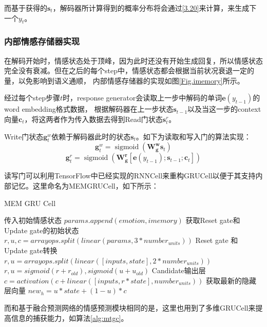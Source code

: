 \documentclass[supercite]{HustGraduPaper}
\theoremstyle{definition}
\begin{document}
而基于获得的$\boldsymbol{s}_t$，解码器所计算得到的概率分布将会通过\ref{3.20}来计算，来生成下一个$y_t$。

\subsubsection{内部情感存储器实现}
在解码开始时，情感状态处于顶峰，因为此时还没有开始生成回复，所以情感状态完全没有衰减。但在之后的每个step中，情感状态都会根据当前状况衰退一定的量，以免影响到语义通顺，
内部情感存储器的实现如图\ref{Fig.imemory}所示。

经过每个step步骤$t$时，response generator会读取上一步中解码的单词$\boldsymbol{e}(y_{t-1})$的word embedding格式数据，
根据解码器在上一步状态$\boldsymbol{s}_{t-1}$以及当这一步的context向量$\boldsymbol{c}_t$，将这两者作为传入数据去得到Read门状态${\boldsymbol{s}_t^r}$。

Write门状态$\boldsymbol{g}_t^w$依赖于解码器此时的状态$\boldsymbol{s}_t$。如下为读取和写入门的算法实现：
$$\boldsymbol { g } _ { t } ^ { w } = \operatorname { sigmoid } \left( \mathbf { W } _ { \mathbf { g } } ^ { \mathbf { w } } \boldsymbol { s } _ { t } \right)$$
$$\boldsymbol { g } _ { t } ^ { r } = \operatorname { sigmoid } \left( \mathbf { W } _ { \mathbf { g } } ^ { \mathbf { r } } \left[ \boldsymbol { e } \left( y _ { t - 1 } \right) ; \boldsymbol { s } _ { t - 1 } ; \boldsymbol { c } _ { t } \right] \right)$$

读写门可以利用TensorFlow中已经实现的RNNCell来重构GRUCell以便于其支持内部记忆。这里命名为MEMGRUCell，如下所示：
\begin{algorithm}
  \caption{MEM GRU Cell}
  \label{alg:mgc}
  \begin{algorithmic}
    \State 传入初始情感状态
    \State $params.append(emotion,imemory)$
    \State 获取Reset gate和Update gate的初始状态
    \State $r, u, c = arrayops.split(linear(params, 3 * number_{units}))$
    \State Reset gate 和 Update gate转换
    \State $r, u = arrayops.split(linear([inputs, state], 2 * number_{units}))$
    \State $r, u = sigmoid(r+r_{old}), sigmoid(u+u_{old})$
    \State Candidate输出层
    \State $c = activation(c+linear([inputs, r * state], number_{units}))$
    \State 获取最新的隐藏层向量
    \State $new_h = u * state + (1 - u) * c$
  \end{algorithmic}
\end{algorithm}

而和基于融合预测网络的情感预测模块相同的是，这里也用到了多维GRUCell来提高信息的捕获能力，如算法\ref{alg:mtgc}。
\end{document}

